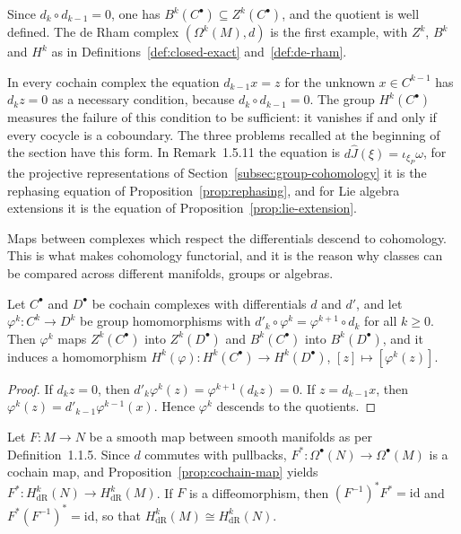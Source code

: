 Since $d_k\circ d_{k-1}=0$, one has $B^k(C^\bullet)\subseteq Z^k(C^\bullet)$, and the quotient is well defined. The de Rham complex $(\Omega^k(M),d)$ is the first example, with $Z^k$, $B^k$ and $H^k$ as in Definitions~\ref{def:closed-exact} and~\ref{def:de-rham}.

\begin{remark}\label{rem:obstruction}
	In every cochain complex the equation $d_{k-1}x=z$ for the unknown $x\in C^{k-1}$ has $d_kz=0$ as a necessary condition, because $d_k\circ d_{k-1}=0$. The group $H^k(C^\bullet)$ measures the failure of this condition to be sufficient: it vanishes if and only if every cocycle is a coboundary. The three problems recalled at the beginning of the section have this form. In Remark~1.5.11 the equation is $d\hat J(\xi)=\iota_{\xi_P}\omega$, for the projective representations of Section~\ref{subsec:group-cohomology} it is the rephasing equation of Proposition~\ref{prop:rephasing}, and for Lie algebra extensions it is the equation of Proposition~\ref{prop:lie-extension}.
\end{remark}

Maps between complexes which respect the differentials descend to cohomology. This is what makes cohomology functorial, and it is the reason why classes can be compared across different manifolds, groups or algebras.

\begin{proposition}\label{prop:cochain-map}
	Let $C^\bullet$ and $D^\bullet$ be cochain complexes with differentials $d$ and $d'$, and let $\varphi^k:C^k\to D^k$ be group homomorphisms with $d'_k\circ\varphi^k=\varphi^{k+1}\circ d_k$ for all $k\geq0$. Then $\varphi^k$ maps $Z^k(C^\bullet)$ into $Z^k(D^\bullet)$ and $B^k(C^\bullet)$ into $B^k(D^\bullet)$, and it induces a homomorphism $H^k(\varphi):H^k(C^\bullet)\to H^k(D^\bullet)$, $[z]\mapsto[\varphi^k(z)]$.
\end{proposition}

\begin{proof}
	If $d_kz=0$, then $d'_k\varphi^k(z)=\varphi^{k+1}(d_kz)=0$. If $z=d_{k-1}x$, then $\varphi^k(z)=d'_{k-1}\varphi^{k-1}(x)$. Hence $\varphi^k$ descends to the quotients.
\end{proof}

\begin{example}[Pullback]\label{ex:pullback}
	Let $F:M\to N$ be a smooth map between smooth manifolds as per Definition~1.1.5. Since $d$ commutes with pullbacks, $F^*:\Omega^\bullet(N)\to\Omega^\bullet(M)$ is a cochain map, and Proposition~\ref{prop:cochain-map} yields $F^*:H^k_{\mathrm{dR}}(N)\to H^k_{\mathrm{dR}}(M)$. If $F$ is a diffeomorphism, then $(F^{-1})^*F^*=\mathrm{id}$ and $F^*(F^{-1})^*=\mathrm{id}$, so that $H^k_{\mathrm{dR}}(M)\cong H^k_{\mathrm{dR}}(N)$.
\end{example}

